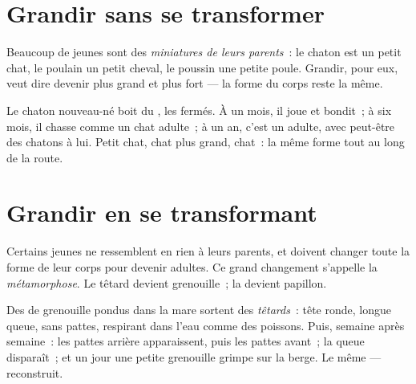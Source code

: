 \section{Grandir sans se transformer}

\begin{definition}\label{def:g2:animals-grow-up:direct}
Beaucoup de jeunes  sont des \emph{miniatures de leurs
parents}~: le chaton est un petit chat,
le poulain un petit cheval, le poussin une petite poule. Grandir, pour
eux, veut dire devenir plus grand et plus fort --- la forme du corps
reste la même.
\end{definition}

\begin{example}\label{ex:g2:animals-grow-up:kitten}
Le chaton nouveau-né boit du , les  fermés. À un mois, il
joue et bondit~; à six mois, il chasse comme un chat adulte~; à un
an, c'est un adulte, avec peut-être des chatons à lui. Petit chat,
chat plus grand, chat~: la même forme tout au long de la route.
\end{example}

\section{Grandir en se transformant}

\begin{definition}[Métamorphose]\label{def:g2:animals-grow-up:metamorphosis}
Certains jeunes  ne ressemblent en rien à leurs parents, et
doivent changer toute la forme de leur corps pour devenir adultes.
Ce grand changement s'appelle la
\emph{métamorphose}. Le têtard devient
grenouille~; la  devient papillon.
\end{definition}

\begin{example}\label{ex:g2:animals-grow-up:frog}
Des  de grenouille pondus dans la mare sortent des
\emph{têtards}~: tête ronde, longue queue, sans
pattes, respirant dans l'eau comme des poissons. Puis, semaine après
semaine~: les pattes arrière apparaissent, puis les pattes avant~;
la queue disparaît~; et un jour une petite grenouille grimpe sur la
berge. Le même  --- reconstruit.
\end{example}

